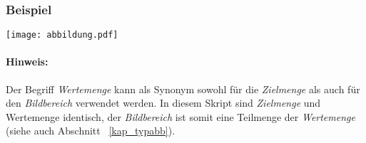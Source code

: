 \subsubsection*{Beispiel}
\texttt{[image: abbildung.pdf]}

\paragraph{Hinweis:}
Der Begriff \emph{Wertemenge} kann als Synonym sowohl für die \emph{Zielmenge}
als auch für den \emph{Bildbereich} verwendet werden. In diesem Skript sind
\emph{Zielmenge} und {Wertemenge} identisch, der \emph{Bildbereich} ist somit
eine Teilmenge der \emph{Wertemenge} (siehe auch Abschnitt ~\ref{kap_typabb}).
